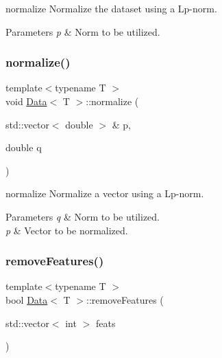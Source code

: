 normalize Normalize the dataset using a Lp-\/norm. 


\begin{DoxyParams}{Parameters}
{\em p} & Norm to be utilized. \\
\hline
\end{DoxyParams}
\mbox{\label{class_data_ad5c41d33e1de7531b952d6f33b7eca90}} 
\subsubsection{\texorpdfstring{normalize()}{normalize()}\hspace{0.1cm}{\footnotesize\ttfamily [2/2]}}
{\footnotesize\ttfamily template$<$typename T $>$ \\
void \mbox{\hyperlink{class_data}{Data}}$<$ T $>$\+::normalize (\begin{DoxyParamCaption}\item[{std\+::vector$<$ double $>$ \&}]{p,  }\item[{double}]{q }\end{DoxyParamCaption})\hspace{0.3cm}{\ttfamily [static]}}



normalize Normalize a vector using a Lp-\/norm. 


\begin{DoxyParams}{Parameters}
{\em q} & Norm to be utilized. \\
\hline
{\em p} & Vector to be normalized. \\
\hline
\end{DoxyParams}
\mbox{\label{class_data_a574b881ce5042c5a13d79c187aa3f923}} 
\subsubsection{\texorpdfstring{remove\+Features()}{removeFeatures()}}
{\footnotesize\ttfamily template$<$typename T $>$ \\
bool \mbox{\hyperlink{class_data}{Data}}$<$ T $>$\+::remove\+Features (\begin{DoxyParamCaption}\item[{std\+::vector$<$ int $>$}]{feats }\end{DoxyParamCaption})}



